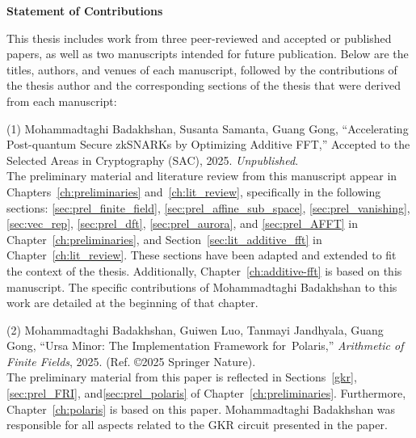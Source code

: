 \cleardoublepage
{}    %

\begin{center}\textbf{Statement of Contributions}\end{center}

This thesis includes work from three peer-reviewed and accepted or published papers, as well as two manuscripts intended for future publication. Below are the titles, authors, and venues of each manuscript, followed by the contributions of the thesis author and the corresponding sections of the thesis that were derived from each manuscript:

\noindent (1) Mohammadtaghi Badakhshan, Susanta Samanta, Guang Gong, ``Accelerating Post-quantum Secure zkSNARKs by Optimizing Additive FFT,'' Accepted to the Selected Areas in Cryptography (SAC), 2025. \textit{Unpublished}.\ \\
The preliminary material and literature review from this manuscript appear in Chapters~\ref{ch:preliminaries} and~\ref{ch:lit_review}, specifically in the following sections: \ref{sec:prel_finite_field}, \ref{sec:prel_affine_sub_space}, \ref{sec:prel_vanishing}, \ref{sec:vec_rep}, \ref{sec:prel_dft}, \ref{sec:prel_aurora}, and \ref{sec:prel_AFFT} in Chapter~\ref{ch:preliminaries}, and Section~\ref{sec:lit_additive_fft} in Chapter~\ref{ch:lit_review}. These sections have been adapted and extended to fit the context of the thesis.
Additionally, Chapter~\ref{ch:additive-fft} is based on this manuscript. The specific contributions of Mohammadtaghi Badakhshan to this work are detailed at the beginning of that chapter.

\noindent (2) Mohammadtaghi Badakhshan, Guiwen Luo, Tanmayi Jandhyala, Guang Gong, ``Ursa Minor: The Implementation Framework for Polaris,'' \textit{Arithmetic of Finite Fields}, 2025. (Ref. \cite{Badakhshan2025Ursa} \copyright \hspace{.1em}2025 Springer Nature).\\
The preliminary material from this paper is reflected in Sections~\ref{gkr},\ref{sec:prel_FRI}, and\ref{sec:prel_polaris} of Chapter~\ref{ch:preliminaries}. Furthermore, Chapter~\ref{ch:polaris} is based on this paper. Mohammadtaghi Badakhshan was responsible for all aspects related to the GKR circuit presented in the paper.

